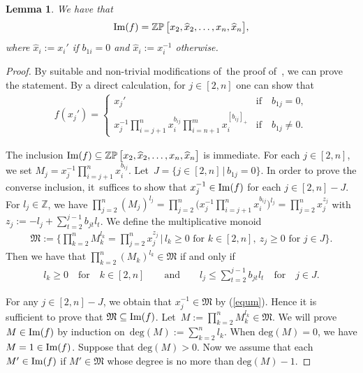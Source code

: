 \documentclass[pdftex]{sigma}
\numberwithin{equation}{section}
\newtheorem{Lemma}[Theorem]{Lemma}
\begin{document}
\begin{Lemma}\label{lemim}
We have that
\begin{gather*}
\mathop{\rm Im} (f)=\mathop{\mathbb{ZP}}\big[x_2,\widehat{x}_{2},\ldots,x_n,\widehat{x}_{n}\big],
\end{gather*}
where $\widehat{x}_{i}:= x_{i}'$ if $b_{1i}=0$ and $\widehat{x}_{i}:= x_{i}^{-1}$ otherwise.
\end{Lemma}

\begin{proof}
By suitable and non-trivial modifications of~the proof of~\cite[Lemma~6.6]{bfz}, we can prove the statement. By a direct calculation, for $j\in[2,n]$ one can show that
\begin{gather*}
 f(x_{j}') = \begin{cases}
 x_{j}' &\text{if}\quad b_{1j}=0,
 \\
 x_{j}^{-1}\prod\limits_{i=j+1}^{n}x_{i}^{b_{ij}}\prod\limits_{i=n+1}^{m}x_{i}^{[b_{ij}]_+}
 &\text{if} \quad b_{1j}\neq 0.
\end{cases}
\end{gather*}

The inclusion $\mathop{\rm Im}(f)\subseteq\mathop{\mathbb{ZP}}\big[x_2,\widehat{x}_{2},\ldots,x_n,\widehat{x}_{n}\big]$ is immediate. For each $j\in[2,n]$, we set
$M_j=x_{j}^{-1}\prod\limits_{i=j+1}^{n}x_{i}^{b_{ij}}.$ Let~$J=\{j\in[2,n]\,|\, b_{1j}=0\}$. In order to prove the converse inclusion, it~suf\-fi\-ces to show that $x_{j}^{-1}\in\mathop{\rm Im}(f)$ for each $j\in[2,n]-J$\!. For $l_j\in \mathbb{Z}$, we have
$\prod\limits_{j=2}^{n}(M_{j})^{l_j}=\prod\limits_{j=2}^{n}
\Big(x_{j}^{-1}\prod\limits_{i=j+1}^{n}x_{i}^{b_{ij}}\Big)^{l_j}
=\prod\limits_{j=2}^{n}x_{j}^{z_j}$ with $z_j:= {-l_j+\sum\limits_{t=2}^{j-1}b_{jt}l_{t}}$.
We define the multiplicative monoid
\begin{gather*}
\mathfrak{M}:=\Bigg\{\prod\limits_{k=2}^{n}M_{k}^{l_k}=\prod\limits_{j=2}^{n}x_{j}^{z_j} \,|\, l_k\geq0 \text{ for } k\in[2,n],\ z_j\geq0\text{ for } j \in J\Bigg\}.
\end{gather*}
Then we have that $\prod\limits_{k=2}^{n}(M_{k})^{l_k}\in\mathfrak{M}$ if and only if
\begin{gather}\label{equm}
l_k\geq0 \quad\text{for}\quad k\in[2,n]\qquad\text{and}\qquad
l_j\leq \sum\limits_{t=2}^{j-1}b_{jt}l_{t}\quad\text{for}\quad j\in J.
\end{gather}

For any $j\in [2,n]-J$, we obtain that $x_{j}^{-1}\in \mathfrak{M}$ by (\ref{equm}). Hence it is sufficient to prove that $\mathfrak{M}\subseteq \mathop{\rm Im}(f)$. Let~$M:=\prod\limits_{k=2}^{n}M_{k}^{l_k}\in\mathfrak{M}$. We will prove $M\in\mathop{\rm Im}(f)$ by induction on~\mbox{$\text{deg}(M):=\sum\limits_{k=2}^{n}l_{k}$}. When $\text{deg}(M)=0$, we have $M=1\in\mathop{\rm Im}(f)$. Suppose that $\text{deg}(M)>0$. Now we assume that each $M'\in\mathop{\rm Im}(f)$ if $M'\in\mathfrak{M}$ whose degree is no more than $\text{deg}(M)-1$.


\end{proof}
\end{document}
